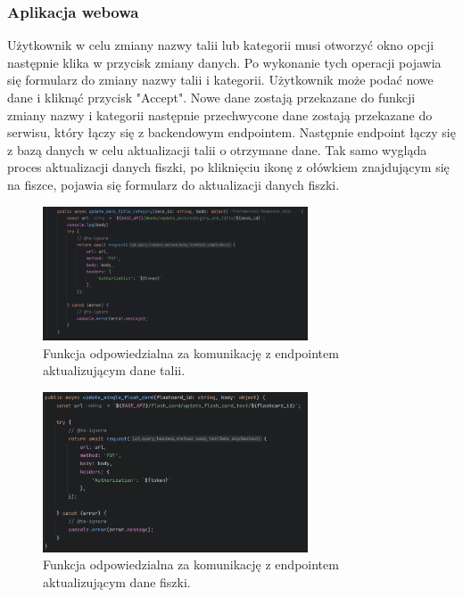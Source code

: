 \subsubsection{Aplikacja webowa}

Użytkownik w celu zmiany nazwy talii lub kategorii musi otworzyć okno opcji następnie klika w przycisk zmiany danych. Po wykonanie tych operacji pojawia się formularz do zmiany nazwy talii i kategorii. Użytkownik może podać nowe dane i kliknąć przycisk "Accept". Nowe dane zostają przekazane do funkcji zmiany nazwy i kategorii następnie przechwycone dane zostają przekazane do serwisu, który łączy się z backendowym endpointem. Następnie endpoint łączy się z bazą danych w celu aktualizacji talii o otrzymane dane. Tak samo wygląda proces aktualizacji danych fiszki, po kliknięciu ikonę z ołówkiem znajdującym się na fiszce, pojawia się formularz do aktualizacji danych fiszki.

\begin{figure}[H]
    \centering
    \includegraphics[width=0.7\textwidth]{chapters/chapter_8/screens/update_deck_web}
    \caption{Funkcja odpowiedzialna za komunikację z endpointem aktualizującym dane talii.}
    \label{img:update_deck_web}
\end{figure}

\begin{figure}[H]
    \centering
    \includegraphics[width=0.7\textwidth]{chapters/chapter_8/screens/update_flash_card_text_web}
    \caption{Funkcja odpowiedzialna za komunikację z endpointem aktualizującym dane fiszki.}
    \label{img:update_flash_card_web}
\end{figure}

